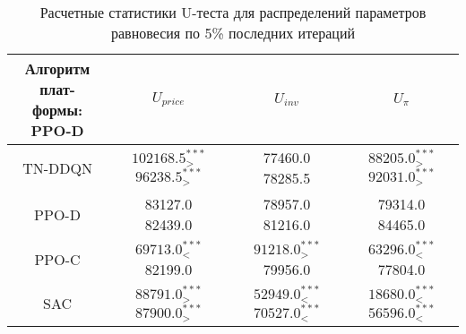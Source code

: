 \bgroup
\def\arraystretch{1.25}
\begin{table}[H]
	\caption{Расчетные статистики U-теста для распределений параметров равновесия по 5\% последних итераций}
	\label{tables:U_dynamic}
	\begin{center}
		\vspace{-0.5em}
		\begin{tabular}{c||ccc}
			\toprule
			\makecell{Алгоритм плат-\\ формы: PPO-D} & $U_{price}$ & $U_{inv}$ & $U_{\pi}$ \\
			\midrule
			TN-DDQN & \makecell[c]{ $102168.5^{***}_{>} $\\ $96238.5^{***}_{>} $\\[1ex] } & \makecell[c]{ 77460.0\\ 78285.5\\[1ex] } & \makecell[c]{ $88205.0^{***}_{>} $\\ $92031.0^{***}_{>} $\\[1ex] } \\
			PPO-D & \makecell[c]{ 83127.0\\ 82439.0\\[1ex] } & \makecell[c]{ 78957.0\\ 81216.0\\[1ex] } & \makecell[c]{ 79314.0\\ 84465.0\\[1ex] } \\
			PPO-C & \makecell[c]{ $69713.0^{***}_{<} $\\ 82199.0\\[1ex] } & \makecell[c]{ $91218.0^{***}_{>} $\\ 79956.0\\[1ex] } & \makecell[c]{ $63296.0^{***}_{<} $\\ 77804.0\\[1ex] } \\
			SAC & \makecell[c]{ $88791.0^{***}_{>} $\\ $87900.0^{***}_{>} $\\[1ex] } & \makecell[c]{ $52949.0^{***}_{<} $\\ $70527.0^{***}_{<} $\\[1ex] } & \makecell[c]{ $18680.0^{***}_{<} $\\ $56596.0^{***}_{<} $\\[1ex] } \\
			\bottomrule
		\end{tabular}
	\end{center}
\end{table}
\egroup